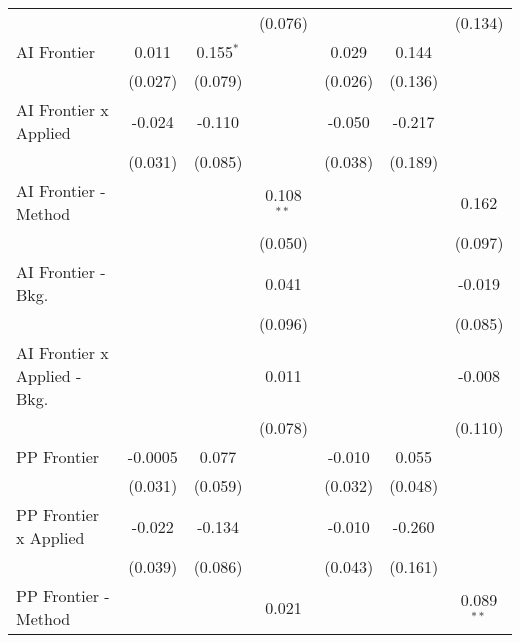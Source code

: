\begin{tabular}{lcccccc}
                                  &                &              & (0.076)       &                &               & (0.134)\\   
   AI Frontier                    & 0.011          & 0.155$^{*}$  &               & 0.029          & 0.144         &   \\   
                                  & (0.027)        & (0.079)      &               & (0.026)        & (0.136)       &   \\   
   AI Frontier x Applied          & -0.024         & -0.110       &               & -0.050         & -0.217        &   \\   
                                  & (0.031)        & (0.085)      &               & (0.038)        & (0.189)       &   \\   
   AI Frontier - Method           &                &              & 0.108$^{**}$  &                &               & 0.162\\   
                                  &                &              & (0.050)       &                &               & (0.097)\\   
   AI Frontier - Bkg.             &                &              & 0.041         &                &               & -0.019\\   
                                  &                &              & (0.096)       &                &               & (0.085)\\   
   AI Frontier x Applied - Bkg.   &                &              & 0.011         &                &               & -0.008\\   
                                  &                &              & (0.078)       &                &               & (0.110)\\   
   PP Frontier                    & -0.0005        & 0.077        &               & -0.010         & 0.055         &   \\   
                                  & (0.031)        & (0.059)      &               & (0.032)        & (0.048)       &   \\   
   PP Frontier x Applied          & -0.022         & -0.134       &               & -0.010         & -0.260        &   \\   
                                  & (0.039)        & (0.086)      &               & (0.043)        & (0.161)       &   \\   
   PP Frontier - Method           &                &              & 0.021         &                &               & 0.089$^{**}$\\   

\end{tabular}
